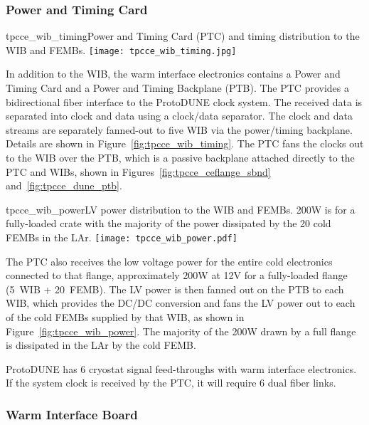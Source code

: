 \subsubsection{Power and Timing Card}
\label{subsubsec:power_timing_card}

\begin{cdrfigure}{tpcce_wib_timing}{Power and Timing Card (PTC) 
and timing distribution to the WIB and FEMBs.}
\texttt{[image: tpcce\_wib\_timing.jpg]}
\end{cdrfigure}

In addition to the WIB, the warm interface electronics contains a
Power and Timing Card and a Power and Timing Backplane
(PTB). The PTC provides a bidirectional fiber interface to the
ProtoDUNE clock system.  The received data is separated into clock and
data using a clock/data separator.  The clock and data
streams are separately fanned-out to five WIB via the power/timing
backplane. Details are shown in
Figure~\ref{fig:tpcce_wib_timing}. The PTC fans the clocks out to the WIB over the
PTB, which is a passive backplane attached directly to the PTC and
WIBs, shown in Figures~\ref{fig:tpcce_ceflange_sbnd} and~\ref{fig:tpcce_dune_ptb}.

\begin{cdrfigure}{tpcce_wib_power}{LV power distribution 
to the WIB and FEMBs. 200W is for a fully-loaded crate 
with the majority of the power dissipated by the 20 cold FEMBs in the LAr.}
\texttt{[image: tpcce\_wib\_power.pdf]}
\end{cdrfigure}

The PTC also receives the low voltage power for the entire cold
electronics connected to that flange, approximately 200W at 12V for a
fully-loaded flange (5~WIB + 20~FEMB). The LV power is then fanned out
on the PTB to each WIB, which provides the DC/DC conversion and fans
the LV power out to each of the cold FEMBs supplied by that WIB, 
as shown in Figure~\ref{fig:tpcce_wib_power}. The 
majority of the 200W drawn by a full flange is dissipated in the LAr
by the cold FEMB.

ProtoDUNE has 6 cryostat signal feed-throughs with warm interface electronics. 
If the system clock is received by the PTC, it will require 6 dual fiber links.

\subsubsection{Warm Interface Board}
\label{subsubsec:warm_interface_board}

